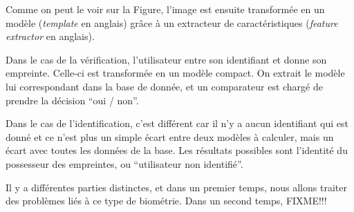 Comme on peut le voir sur la Figure, l'image est ensuite transformée
en un modèle (\emph{template} en anglais) grâce à un extracteur de
caractéristiques (\emph{feature extractor} en anglais).

Dans le cas de la vérification, l'utilisateur entre son identifiant et
donne son empreinte. Celle-ci est transformée en un modèle compact.
On extrait le modèle lui correspondant dans la base de donnée, et un
comparateur est chargé de prendre la décision ``oui / non''.

Dans le cas de l'identification, c'est différent car il n'y a aucun
identifiant qui est donné et ce n'est plus un simple écart entre deux
modèles à calculer, mais un écart avec toutes les données de la base.
Les résultats possibles sont l'identité du possesseur des empreintes,
ou ``utilisateur non identifié''.

Il y a différentes parties distinctes, et dans un premier temps, nous
allons traiter des problèmes liés à ce type de biométrie. Dans un
second temps, FIXME!!!


